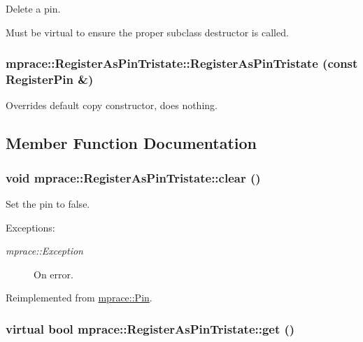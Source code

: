 Delete a pin. 

Must be virtual to ensure the proper subclass destructor is called.\hypertarget{classmprace_1_1RegisterAsPinTristate_b0}{
\subsubsection[RegisterAsPinTristate]{\setlength{\rightskip}{0pt plus 5cm}mprace::Register\-As\-Pin\-Tristate::Register\-As\-Pin\-Tristate (const Register\-Pin \&)}}
\label{classmprace_1_1RegisterAsPinTristate_b0}


Overrides default copy constructor, does nothing. 



\subsection{Member Function Documentation}
\hypertarget{classmprace_1_1RegisterAsPinTristate_a6}{
\subsubsection[clear]{\setlength{\rightskip}{0pt plus 5cm}void mprace::Register\-As\-Pin\-Tristate::clear ()}}
\label{classmprace_1_1RegisterAsPinTristate_a6}


Set the pin to false. 

\begin{Desc}
\item[Exceptions:]
\begin{description}
\item[{\em mprace::Exception}]On error.\end{description}
\end{Desc}


Reimplemented from \hyperlink{classmprace_1_1Pin_a4}{mprace::Pin}.\hypertarget{classmprace_1_1RegisterAsPinTristate_a4}{
\subsubsection[get]{\setlength{\rightskip}{0pt plus 5cm}virtual bool mprace::Register\-As\-Pin\-Tristate::get ()}}
\label{classmprace_1_1RegisterAsPinTristate_a4}


